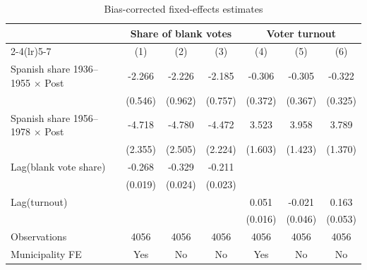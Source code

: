 \begin{table}[htbp]
\centering
\caption{Bias-corrected fixed-effects estimates}
\label{tab:dynamic\_correction}
\begin{tabular}{l*{6}{c}}
\hline
            &\multicolumn{3}{c}{Share of blank votes}                         &\multicolumn{3}{c}{Voter turnout}                                \\\cmidrule(lr){2-4}\cmidrule(lr){5-7}
            &\multicolumn{1}{c}{(1)}         &\multicolumn{1}{c}{(2)}         &\multicolumn{1}{c}{(3)}         &\multicolumn{1}{c}{(4)}         &\multicolumn{1}{c}{(5)}         &\multicolumn{1}{c}{(6)}         \\
\hline
Spanish share 1936--1955 $\times$ Post&      -2.266\sym{***}&      -2.226\sym{**} &      -2.185\sym{***}&      -0.306         &      -0.305         &      -0.322         \\
            &     (0.546)         &     (0.962)         &     (0.757)         &     (0.372)         &     (0.367)         &     (0.325)         \\
Spanish share 1956--1978 $\times$ Post&      -4.718\sym{**} &      -4.780\sym{*}  &      -4.472\sym{**} &       3.523\sym{**} &       3.958\sym{***}&       3.789\sym{***}\\
            &     (2.355)         &     (2.505)         &     (2.224)         &     (1.603)         &     (1.423)         &     (1.370)         \\
Lag(blank vote share)&      -0.268\sym{***}&      -0.329\sym{***}&      -0.211\sym{***}&                     &                     &                     \\
            &     (0.019)         &     (0.024)         &     (0.023)         &                     &                     &                     \\
Lag(turnout)&                     &                     &                     &       0.051\sym{***}&      -0.021         &       0.163\sym{***}\\
            &                     &                     &                     &     (0.016)         &     (0.046)         &     (0.053)         \\
\hline
Observations&        4056         &        4056         &        4056         &        4056         &        4056         &        4056         \\
Municipality FE&         Yes         &          No         &          No         &         Yes         &          No         &          No         \\

\end{tabular}
\end{table}
